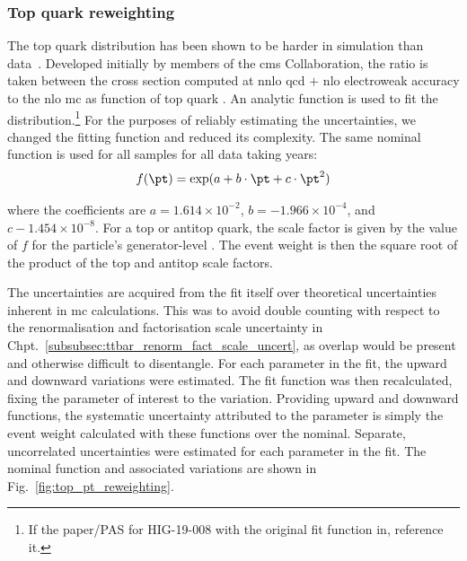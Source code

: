 

\subsubsection{Top quark \texorpdfstring{\pt}{pT} reweighting}
\label{subsubsec:htoinv_top_pt_reweighting}

The top quark \pt distribution has been shown to be harder in simulation than data~\cite{Sirunyan:2018ucr}. Developed initially by members of the \acrshort{cms} Collaboration, the ratio is taken between the \ttbar cross section computed at \acrshort{nnlo} \acrshort{qcd} $+$ \acrshort{nlo} electroweak accuracy to the \acrshort{nlo} \POWHEG \acrshort{mc} as function of top quark \pt. An analytic function is used to fit the distribution.\footnote{If the paper/PAS for HIG-19-008 with the original fit function in, reference it.} For the purposes of reliably estimating the uncertainties, we changed the fitting function and reduced its complexity. The same nominal function is used for all \ttbarpjets samples for all data taking years:
\begin{equation}
    f(\pt) = \exp(a + b \cdot \pt + c \cdot \pt^2)
\end{equation}

where the coefficients are $a = 1.614 \times 10^{-2}$, $b = -1.966 \times 10^{-4}$, and $c -1.454 \times 10^{-8}$. For a top or antitop quark, the scale factor is given by the value of $f$ for the particle's generator-level \pt. The event weight is then the square root of the product of the top and antitop scale factors.

The uncertainties are acquired from the fit itself over theoretical uncertainties inherent in \acrshort{mc} calculations. This was to avoid double counting with respect to the renormalisation and factorisation scale uncertainty in Chpt.~\ref{subsubsec:ttbar_renorm_fact_scale_uncert}, as overlap would be present and otherwise difficult to disentangle. For each parameter in the fit, the upward and downward variations were estimated. The fit function was then recalculated, fixing the parameter of interest to the variation. Providing upward and downward functions, the systematic uncertainty attributed to the parameter is simply the event weight calculated with these functions over the nominal. Separate, uncorrelated uncertainties were estimated for each parameter in the fit. The nominal function and associated variations are shown in Fig.~\ref{fig:top_pt_reweighting}.

